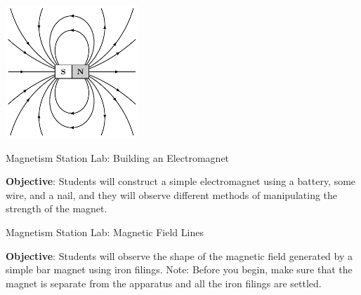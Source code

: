 \documentclass[]{exam}
\begin{document}
\begin{questions}
\begin{parts}
\begin{center}
    \includegraphics[width=5cm]{documents/figures/magnetic-field-lines-1.pdf}
\end{center}

\end{parts}

\question
Magnetism Station Lab: Building an Electromagnet

\textbf{Objective}: Students will construct a simple electromagnet using a battery, some wire, and a nail, and they will observe different methods of manipulating the strength of the magnet.


\question
Magnetism Station Lab: Magnetic Field Lines

\textbf{Objective}: Students will observe the shape of the magnetic field generated by a simple bar magnet using iron filings. Note: Before you begin, make sure that the magnet is separate from the apparatus and all the iron filings are settled.


\end{questions}
\end{document}

